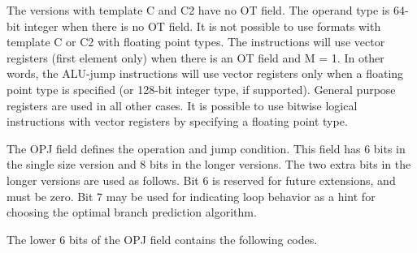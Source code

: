 \documentclass[forwardcom.tex]{subfiles}
\begin{document}
The versions with template C and C2 have no OT field. The operand type is 64-bit integer when there is no OT field. It is not possible to use formats with template C or C2 with floating point types. The instructions will use vector registers (first element only) when there is an OT field and M = 1. In other words, the ALU-jump instructions will use vector registers only when a floating point type is specified (or 128-bit integer type, if supported). General purpose registers are used in all other cases. It is possible to use bitwise logical instructions with vector registers by specifying a floating point type. 
\vspace{2mm}

The OPJ field defines the operation and jump condition. This field has 6 bits in the single size version and 8 bits in the longer versions. The two extra bits in the longer versions are used as follows. Bit 6 is reserved for future extensions, and must be zero. Bit 7 may be used for indicating loop behavior as a hint for choosing the optimal branch prediction algorithm.
\vspace{2mm}

The lower 6 bits of the OPJ field contains the following codes.
\end{document}
